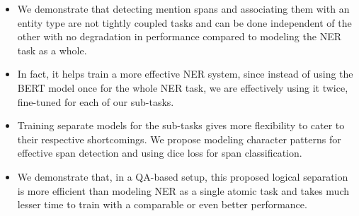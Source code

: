 \begin{itemize}
    \item We demonstrate that detecting mention spans and associating them with an entity type are not tightly coupled tasks and can be done independent of the other with no degradation in performance compared to modeling the NER task as a whole. 
    
     \item In fact, it helps train a more effective NER system, since instead of using the BERT model once for the whole NER task, we are effectively using it twice, fine-tuned for each of our sub-tasks.
     
    
    \item Training separate models for the sub-tasks gives more flexibility to cater to their respective shortcomings. We propose modeling character patterns for effective span detection and using dice loss for span classification.
    
    \item We demonstrate that, in a QA-based setup, this proposed logical separation is more efficient than modeling NER as a single atomic task and takes much lesser time to train with a comparable or even better performance.
\end{itemize}

